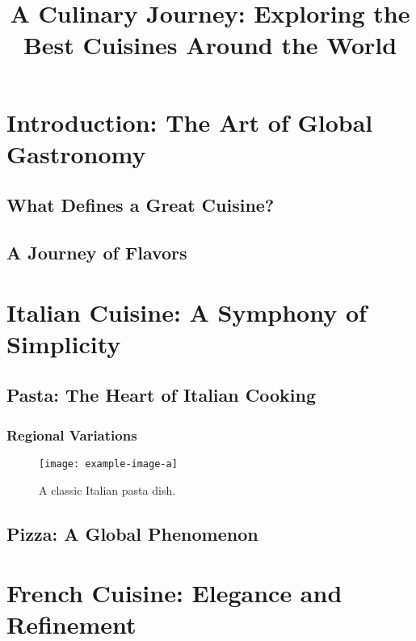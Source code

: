 \documentclass{book}
\title{A Culinary Journey: Exploring the Best Cuisines Around the World}
\author{}
\date{}
\begin{document}
\maketitle

\tableofcontents

\chapter{Introduction: The Art of Global Gastronomy}

\section{What Defines a Great Cuisine?}

\lipsum[1-2] %

\section{A Journey of Flavors}

\lipsum[3-4] %

\chapter{Italian Cuisine: A Symphony of Simplicity}

\section{Pasta: The Heart of Italian Cooking}

\lipsum[5-6]

\subsection{Regional Variations}

\lipsum[7-8]

\begin{figure}[H]
\centering
\texttt{[image: example-image-a]} %
\caption{A classic Italian pasta dish.}
\label{fig:pasta}
\end{figure}

\section{Pizza: A Global Phenomenon}

\lipsum[9-10]

\chapter{French Cuisine: Elegance and Refinement}
\end{document}
